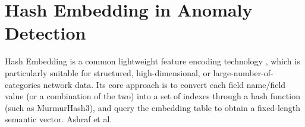 \begin{ZhChapter}
    \begin{table*}[htbp]
        \centering
        \caption{Examples of Field-Value Tokenization in IoT Network Traffic}
        \label{tab:tokenization_examples}
        \vspace{0.5em}
    \end{table*}



    \section{Hash Embedding in Anomaly Detection} \label{sec:hash_embedding}
    Hash Embedding is a common lightweight feature encoding technology \cite{svenstrup2017hash}, which is particularly suitable for structured, high-dimensional, or large-number-of-categories network data. Its core approach is to convert each field name/field value (or a combination of the two) into a set of indexes through a hash function (such as MurmurHash3), and query the embedding table to obtain a fixed-length semantic vector.  Ashraf et al.


\end{ZhChapter}
